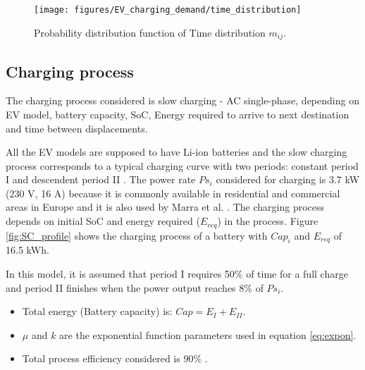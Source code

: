 \documentclass[a4paper,11pt,twoside,openright]{report}
\begin{document}
\begin{figure}[h!]
	\centering
	\texttt{[image: figures/EV\_charging\_demand/time\_distribution]} 
	\caption{Probability distribution function of Time distribution $m_{ij}$. \cite{Cetelem_Distancia} \label{fig:mij}}
\end{figure}

\subsection{Charging process} \label{sec:Charging_process}

The charging process considered is slow charging - AC single-phase, depending on EV model, battery capacity, SoC, Energy required to arrive to next destination and time between displacements.

All the EV models are supposed to have Li-ion batteries and the slow charging process corresponds to a typical charging curve with two periods: constant period I and descendent period II \cite{Marra_baterias}. The power rate $Ps_{i}$ considered for charging is 3.7 kW (230 V, 16 A) because it is commonly available in residential and commercial areas in Europe \cite{Valsera2009} and it is also used by Marra et al. \cite{Marra_baterias}. The charging process depends on initial SoC and energy required ($E_{req}$) in the process. Figure \ref{fig:SC_profile} shows the charging process of a battery with $Cap_{i}$ and $E_{req}$ of 16.5 kWh.

In this model, it is assumed that period I requires 50$\%$ of time for a full charge and period II finishes when the power output reaches 8$\%$ of $Ps_{i}$.

\begin{itemize}
	\item Total energy (Battery capacity) is:  $Cap=E_{I} + E_{II}$.
	\item $\mu$ and $k$ are the exponential function parameters used in equation \ref{eq:expon}.
	\item Total process efficiency considered is 90$\%$ \cite{Clement2010}.
\end{itemize}
\end{document}

